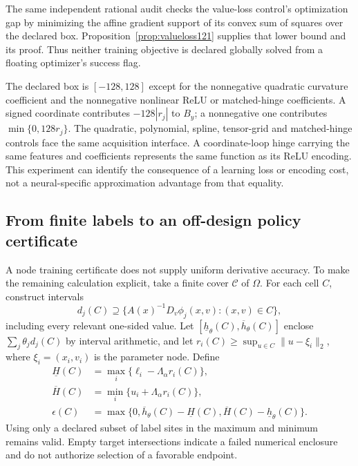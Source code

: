 The same independent rational audit checks the value-loss
control's optimization gap by minimizing the affine gradient
support of its convex sum of squares over the declared box.
Proposition~\ref{prop:valueloss121} supplies that lower bound
and its proof.  Thus neither training objective is declared
globally solved from a floating optimizer's success flag.

The declared box is \([-128,128]\) except for the nonnegative
quadratic curvature coefficient and the nonnegative nonlinear
ReLU or matched-hinge coefficients.  A signed coordinate contributes
\(-128|r_j|\) to \(B_y\); a nonnegative one contributes
\(\min\{0,128r_j\}\).
The quadratic, polynomial, spline, tensor-grid and matched-hinge
controls face the same acquisition interface.  A coordinate-loop
hinge carrying the same features and coefficients represents the
same function as its ReLU encoding.  This experiment can identify
the consequence of a learning loss or encoding cost, not a
neural-specific approximation advantage from that equality.

\subsection{From finite labels to an off-design policy certificate}

A node training certificate does not supply uniform derivative
accuracy.  To make the remaining calculation explicit, take a
finite cover \(\mathcal C\) of \(\Omega\).  For each cell \(C\),
construct intervals
\[
 d_j(C)\supseteq
  \{A(x)^{-1}D_v\phi_j(x,v):(x,v)\in C\},
 \]
including every relevant one-sided value.  Let
\([\underline h_\theta(C),\overline h_\theta(C)]\) enclose
\(\sum_j\theta_jd_j(C)\) by interval arithmetic, and let
\(r_i(C)\geq\sup_{u\in C}\|u-\xi_i\|_2\), where
\(\xi_i=(x_i,v_i)\) is the parameter node.  Define
\begin{align}
 \underline H(C)&=\max_i\{\ell_i-\Lambda_\alpha r_i(C)\},\nonumber\\
 \overline H(C)&=\min_i\{u_i+\Lambda_\alpha r_i(C)\},\nonumber\\
 \epsilon(C)&=\max\{0,\overline h_\theta(C)-\underline H(C),
                     \overline H(C)-\underline h_\theta(C)\}.
 \label{eq:finitecover121}
\end{align}
Using only a declared subset of label sites in the maximum and
minimum remains valid.  Empty target intersections indicate a
failed numerical enclosure and do not authorize selection of a
favorable endpoint.

